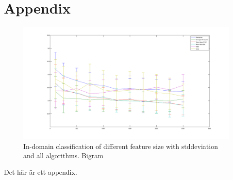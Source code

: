 \chapter{Appendix}
\begin{figure}[H]
\centering
\includegraphics[scale = 0.2]{fig/feature-size100-2500bigram.png}
\caption{In-domain classification of different feature size with stddeviation and all algorithms. Bigram}
\label{fig:trainingsize}
\end{figure} 


Det här är ett appendix.
